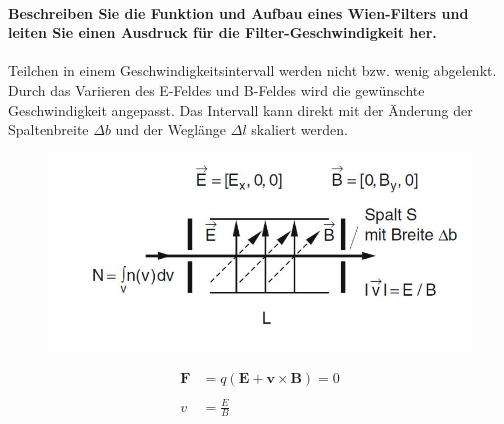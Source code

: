\documentclass[a4paper, 11pt, ngerman, parskip=half-]{scrartcl}
\begin{document}
\paragraph{Beschreiben Sie die Funktion und Aufbau eines Wien-Filters und leiten Sie einen Ausdruck
    für die Filter-Geschwindigkeit her.}
Teilchen in einem Geschwindigkeitsintervall werden nicht bzw. wenig abgelenkt. Durch das Variieren des E-Feldes und B-Feldes wird die gewünschte
Geschwindigkeit angepasst. Das Intervall kann direkt mit der Änderung der Spaltenbreite $\varDelta b$ und der Weglänge $\varDelta l$ skaliert werden.
\begin{figure}[H]
    \includegraphics{image/05/5.7.JPG}
\end{figure}
\begin{align}
    \textbf{F} & = q(\textbf{E} + \textbf{v} \times \textbf{B}) = 0 \\
    \\
    v          & = \frac{E}{B}
\end{align}
\end{document}
